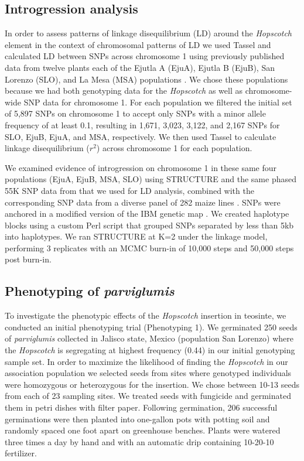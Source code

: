 \documentclass[11pt]{article}
\begin{document}
\begin{linenumbers}
\begin{flushleft}
\subsection*{Introgression analysis}

In order to assess patterns of linkage disequilibrium (LD) around the \emph{Hopscotch} element in the context of chromosomal patterns of LD we used Tassel \citep{Bradbury2007} and calculated LD between SNPs across chromosome 1 using previously published data from twelve plants each of the Ejutla A (EjuA), Ejutla B (EjuB), San Lorenzo (SLO), and La Mesa (MSA) populations \citep{Pyhajarvi2013}. We chose these populations because we had both genotyping data for the \emph{Hopscotch} as well as chromosome-wide SNP data for chromosome 1. For each population we filtered the initial set of 5,897 SNPs on chromosome 1 to accept only SNPs with a minor allele frequency of at least 0.1, resulting in 1,671, 3,023, 3,122, and 2,167 SNPs for SLO, EjuB, EjuA, and MSA, respectively. We then used Tassel \citep{Bradbury2007} to calculate linkage disequilibrium ($r^{2}$) across chromosome 1 for each population. 

We examined evidence of introgression on chromosome 1 in these same four populations (EjuA, EjuB, MSA, SLO) using STRUCTURE \citep{Falush2003} and the same phased 55K SNP data from \citep{Pyhajarvi2013} that we used for LD analysis, combined with the corresponding SNP data from a diverse panel of 282 maize lines \citep{Cook2012}. SNPs were anchored in a modified version of the IBM genetic map \citep{Gerke2013}. We created haplotype blocks using a custom Perl script that grouped SNPs separated by less than 5kb into haplotypes. We ran STRUCTURE at K=2 under the linkage model, performing 3 replicates with an MCMC burn-in of 10,000 steps and 50,000 steps post burn-in.

\subsection*{Phenotyping of \emph{parviglumis}}


To investigate the phenotypic effects of the \emph{Hopscotch} insertion in teosinte, we conducted an initial phenotyping trial (Phenotyping 1). We germinated 250 seeds of \emph{parviglumis} collected in Jalisco state, Mexico (population San Lorenzo) \citep{Hufford2010} where the \emph{Hopscotch} is segregating at highest frequency (0.44) in our initial genotyping sample set. In order to maximize the likelihood of finding the \emph{Hopscotch} in our association population we selected seeds from sites where genotyped individuals were homozygous or heterozygous for the insertion. We chose between 10-13 seeds from each of 23 sampling sites. We treated seeds with fungicide and germinated them in petri dishes with filter paper. Following germination, 206 successful germinations were then planted into one-gallon pots with potting soil and randomly spaced one foot apart on greenhouse benches. Plants were watered three times a day by hand and with an automatic drip containing 10-20-10 fertilizer. 


\end{flushleft}
\end{linenumbers}
\end{document}
